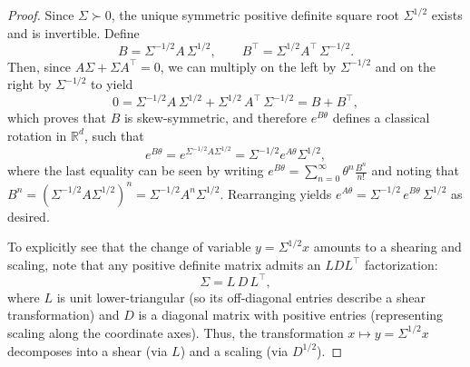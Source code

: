 \documentclass[10pt,a4paper]{amsart}
\newcommand{\R} {\mathbb R}
\begin{document}
\begin{proof}
Since \(\Sigma \succ 0\), the unique symmetric positive definite square root \(\Sigma^{1/2}\) exists and is invertible. Define
\[
B = \Sigma^{-1/2} A\,\Sigma^{1/2}, \qquad B^\top =  \Sigma^{1/2} A^\top\,\Sigma^{-1/2}.
\]
Then, since \(A\Sigma + \Sigma A^\top  = 0\), we can multiply on the left by \(\Sigma^{-1/2}\) and on the right by \(\Sigma^{-1/2}\) to yield
\[
0 = \Sigma^{-1/2} A\,\Sigma^{1/2} + \Sigma^{1/2}\,A^\top \,\Sigma^{-1/2} = B + B^\top,
\]
which proves that \(B\) is skew-symmetric, and therefore \(e^{B\theta}\) defines a classical rotation in \(\R^d\), such that
\[
e^{B\theta} = e^{\Sigma^{-1/2}A\Sigma^{1/2}}=\Sigma^{-1/2}e^{A\theta}\Sigma^{1/2},
\]
where the last equality can be seen by writing $e^{B\theta} = \sum_{n=0}^{\infty} \theta^n \frac{B^n}{n!}$ and noting that $B^n = (\Sigma^{-1/2}A\Sigma^{1/2})^n = \Sigma^{-1/2}A^n\Sigma^{1/2}$. Rearranging yields $e^{A\theta} = \Sigma^{-1/2}\,e^{B\theta}\,\Sigma^{1/2}$ as desired.

To explicitly see that the change of variable \(y = \Sigma^{1/2} x\) amounts to a shearing and scaling, note that any positive definite matrix admits an \(LDL^\top \) factorization:
\[
\Sigma = L\,D\,L^\top ,
\]
where \(L\) is unit lower-triangular (so its off-diagonal entries describe a shear transformation) and \(D\) is a diagonal matrix with positive entries (representing scaling along the coordinate axes). Thus, the transformation \(x\mapsto y=\Sigma^{1/2} x\) decomposes into a shear (via \(L\)) and a scaling (via \(D^{1/2}\)). 
\end{proof}
\end{document}
